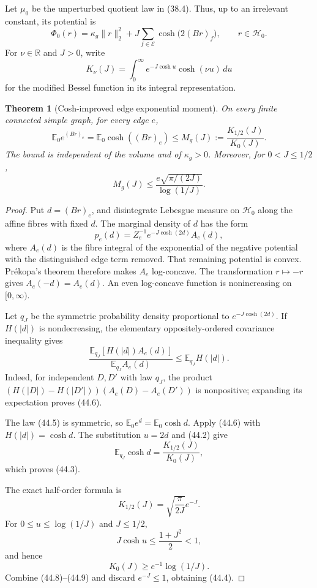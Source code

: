 \documentclass[11pt]{article}
\newtheorem{theorem}{Theorem}[section]
\theoremstyle{remark}
\begin{document}
Let \(\mu_0\) be the unperturbed quotient law in (38.4).  Thus, up to an
irrelevant constant, its potential is
\[
 \Phi_0(r)=
 \kappa_g\|r\|_2^2+
 J\sum_{f\in\mathcal E}\cosh\bigl(2(Br)_f\bigr),
 \qquad r\in\mathcal H_0.                         \tag{44.1}
\]
For \(\nu\in\mathbb R\) and \(J>0\), write
\[
 K_\nu(J)=\int_0^\infty e^{-J\cosh u}\cosh(\nu u)\,du             \tag{44.2}
\]
for the modified Bessel function in its integral representation.

\begin{theorem}[Cosh-improved edge exponential moment]
\label{thm:v17v44-bessel}
On every finite connected simple graph, for every edge \(e\),
\[
\boxed{
 \mathbb E_0e^{(Br)_e}
 =\mathbb E_0\cosh((Br)_e)
 \leq M_g(J):=\frac{K_{1/2}(J)}{K_0(J)}.}          \tag{44.3}
\]
The bound is independent of the volume and of \(\kappa_g>0\).  Moreover,
for \(0<J\leq1/2\),
\[
 M_g(J)
 \leq
 \frac{e\sqrt{\pi/(2J)}}{\log(1/J)}.               \tag{44.4}
\]
\end{theorem}

\begin{proof}
Put \(d=(Br)_e\), and disintegrate Lebesgue measure on
\(\mathcal H_0\) along the affine fibres with fixed \(d\).  The
marginal density of \(d\) has the form
\[
 p_e(d)=Z_e^{-1}e^{-J\cosh(2d)}A_e(d),             \tag{44.5}
\]
where \(A_e(d)\) is the fibre integral of the exponential of the
negative potential with the distinguished edge term removed.  That
remaining potential is convex.  Pr\'ekopa's theorem therefore makes
\(A_e\) log-concave.  The transformation \(r\mapsto-r\) gives
\(A_e(-d)=A_e(d)\).  An even log-concave function is nonincreasing on
\([0,\infty)\).

Let \(q_J\) be the symmetric probability density proportional to
\(e^{-J\cosh(2d)}\).  If \(H(|d|)\) is nondecreasing, the elementary
oppositely-ordered covariance inequality gives
\[
 \frac{\mathbb E_{q_J}[H(|d|)A_e(d)]}
 {\mathbb E_{q_J}A_e(d)}
 \leq\mathbb E_{q_J}H(|d|).                       \tag{44.6}
\]
Indeed, for independent \(D,D'\) with law \(q_J\), the product
\((H(|D|)-H(|D'|))(A_e(D)-A_e(D'))\) is nonpositive; expanding its
expectation proves (44.6).

The law (44.5) is symmetric, so
\(\mathbb E_0e^d=\mathbb E_0\cosh d\).  Apply (44.6) with
\(H(|d|)=\cosh d\).  The substitution \(u=2d\) and (44.2) give
\[
 \mathbb E_{q_J}\cosh d
 =\frac{K_{1/2}(J)}{K_0(J)},                      \tag{44.7}
\]
which proves (44.3).

The exact half-order formula is
\[
 K_{1/2}(J)=\sqrt{\frac{\pi}{2J}}e^{-J}.           \tag{44.8}
\]
For \(0\leq u\leq\log(1/J)\) and \(J\leq1/2\),
\[
 J\cosh u\leq\frac{1+J^2}{2}<1,
\]
and hence
\[
 K_0(J)\geq e^{-1}\log(1/J).                      \tag{44.9}
\]
Combine (44.8)--(44.9) and discard \(e^{-J}\leq1\), obtaining (44.4).
\end{proof}
\end{document}
